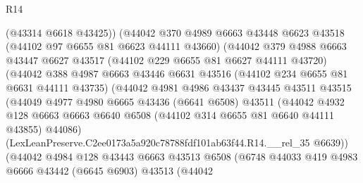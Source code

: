 \begin{lexlean}{R14}
\begin{coremodule}
                        (@43314 @6618 @43425))
                      (@44042
                        @370
                        @4989
                        @6663
                        @43448
                        @6623
                        @43518
                        (@44102 @97 @6655 @81 @6623 @44111 @43660)
                        (@44042
                          @379
                          @4988
                          @6663
                          @43447
                          @6627
                          @43517
                          (@44102 @229 @6655 @81 @6627 @44111 @43720)
                          (@44042
                            @388
                            @4987
                            @6663
                            @43446
                            @6631
                            @43516
                            (@44102 @234 @6655 @81 @6631 @44111 @43735)
                            (@44042
                              @4981
                              @4986
                              @43437
                              @43445
                              @43511
                              @43515
                              (@44049
                                @4977
                                @4980
                                @6665
                                @43436
                                (@6641 @6508)
                                @43511
                                (@44042
                                  @4932
                                  @128
                                  @6663
                                  @6663
                                  @6640
                                  @6508
                                  (@44102 @314 @6655 @81 @6640 @44111 @43855)
                                  @44086)
                                (LexLeanPreserve.C2ee0173a5a920c78788fdf101ab63f44.R14.__rel_35
                                  @6639))
                              (@44042
                                @4984
                                @128
                                @43443
                                @6663
                                @43513
                                @6508
                                (@6748
                                  @44033
                                  @419
                                  @4983
                                  @6666
                                  @43442
                                  (@6645 @6903)
                                  @43513
                                  (@44042

\end{coremodule}
\end{lexlean}
